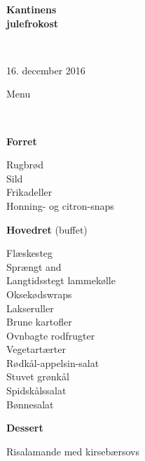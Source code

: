 \begin{center}
\begin{HUGE}
\textbf{Kantinens \\[3mm] julefrokost}
\end{HUGE}
\\[.6cm]
\begin{Large}
16. december 2016
\end{Large}
\end{center}
\vspace*{.01cm}
\begin{center}
\begin{huge}
Menu
\end{huge}
\\[.1cm]
\end{center}
\newcommand{\course}[1]{\vspace*{4mm} \textbf{#1} \vspace{-7mm}}
\newcommand{\goodindent}{\null\hspace{23mm}}
{\small
\begin{center}
\course{Forret}
\end{center}
  \goodindent Rugbrød
\\\goodindent Sild
\\\goodindent Frikadeller
\\\goodindent Honning- og citron-snaps

\begin{center}
\course{Hovedret} (buffet)
\end{center}
  \goodindent Flæskesteg
\\\goodindent Sprængt and
\\\goodindent Langtidsstegt lammekølle
\\\goodindent Oksekødswraps
\\\goodindent Lakseruller
\\\goodindent Brune kartofler
\\\goodindent Ovnbagte rodfrugter
\\\goodindent Vegetartærter
\\\goodindent Rødkål-appelsin-salat
\\\goodindent Stuvet grønkål
\\\goodindent Spidskålssalat
\\\goodindent Bønnesalat

\begin{center}
\course{Dessert}
\end{center}
  \goodindent Risalamande med kirsebærsovs
}
